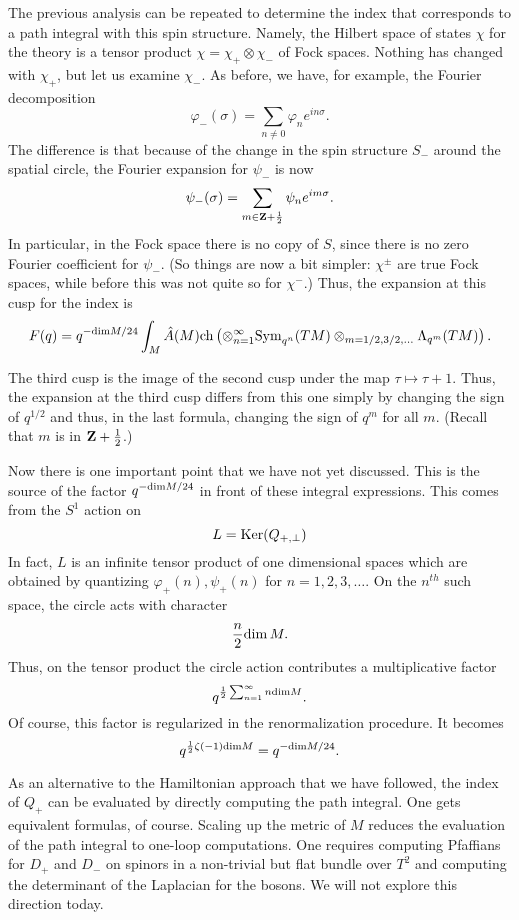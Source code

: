 The previous analysis can be repeated to determine the index that
corresponds to a path integral with this spin structure.
 Namely, the Hilbert space of states $\chi$ for the theory is
a tensor product $\chi=\chi_+\otimes \chi_-$ of Fock spaces.
Nothing has changed with $\chi_+$, but let us examine $\chi_-$.
 As
before, we have, for example, the Fourier decomposition
$$\varphi_-(\sigma)=\sum_{n\not= 0}\varphi_ne^{in\sigma}.$$
The difference is that because of the change in the spin structure
$S_-$ around the spatial circle, the Fourier expansion for $\psi_-$ is now
$$\psi_-(\sigma)=\sum_{m\in {\bf Z}+\frac{1}{2}}\psi_ne^{im\sigma}.$$
In particular, in the Fock space there is no copy of $S$, since there
is no zero Fourier coefficient for $\psi_-$. (So things are now a bit
simpler: $\chi^{\pm}$ are true Fock spaces, while before this was not quite
so for $\chi^-$.)  Thus, the expansion at
this cusp for the index is
$$F(q)=q^{-{\rm dim} M/24}\int_M\hat A(M){\rm
ch}\left(\otimes_{n=1}^\infty{\rm
Sym}_{q^n}(TM)\otimes_{m=1/2,3/2,\ldots}\Lambda_{q^m}(TM)\right).$$ 

The third cusp is the image of the second cusp under the map
$\tau\mapsto \tau+1$. Thus, the expansion at the third cusp differs
from this one simply by changing the sign of $q^{1/2}$
and thus, in the last formula,
 changing the sign of $q^{m}$ for all $m$.  (Recall that $m$
is in ${\bf Z}+\frac{1}{2}$.)

Now there is one important point that we have not yet discussed. This
is the source of the factor $q^{-{\rm dim}M/24}$ in front of these
integral expressions. This comes from the $S^1$ action on
$$L={\rm Ker}(Q_{+,\perp})$$ 
In fact, $L$ is an infinite
tensor product of one dimensional spaces which are obtained by quantizing
$\varphi_+(n), \psi_+(n)$ for $n=1,2,3,\dots.$  On the $n^{th}$ such
space, the circle acts with character
$${n\over 2}{\rm dim}\, M.$$
Thus, on the tensor product the circle action contributes a
multiplicative factor
$$q^{\frac{1}{2}\sum_{n=1}^\infty n{\rm dim}M}.$$
Of course, this factor is regularized in the renormalization
procedure. It becomes
$$q^{\frac{1}{2}\zeta(-1){\rm dim}M}=q^{-{\rm dim}M/24}.$$

As an alternative to the Hamiltonian approach that we have followed,
the index of $Q_+$ can be evaluated
by  directly computing the path integral. One gets equivalent formulas,
of course.  Scaling up the metric of $M$
reduces the evaluation of the path integral to one-loop computations.
One requires computing Pfaffians for $D_+$ 
and $D_-$ on spinors in a non-trivial but flat bundle over $T^2$ and
 computing the determinant of the Laplacian for the
bosons.  We will not explore this direction today.



